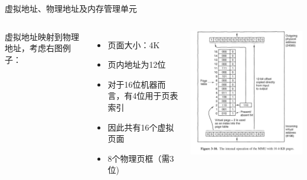 \documentclass[xcolor=svgnames]{beamer}
\begin{document}
\begin{CJK*}{UTF8}{gbsn}
\begin{frame}{虚拟地址、物理地址及内存管理单元}
\begin{columns}%
虚拟地址映射到物理地址，考虑右图例子：
\begin{itemize}
\item 页面大小：4K 
\item 页内地址为12位
\item 对于16位机器而言，有4位用于页表索引
\item 因此共有16个虚拟页面
\item 8个物理页框（需3位)
\end{itemize}
\includegraphics[width=1.0\textwidth]{mmu2.png}
\end{columns}%
\end{frame}


\end{CJK*}
\end{document}
